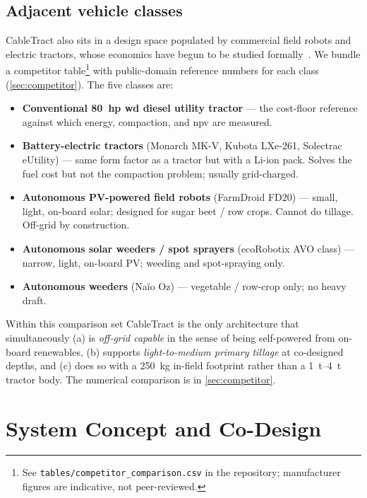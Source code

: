 \documentclass[11pt,a4paper]{article}
\begin{document}
\subsection{Adjacent vehicle classes}\label{sec:related-adjacent}

CableTract also sits in a design space populated by commercial field robots and electric tractors, whose economics have begun to be studied formally~\cite{lagnelov2021cost,lowenberg2020economics}. We bundle a competitor table\footnote{See \texttt{tables/competitor\_comparison.csv} in the repository; manufacturer figures are indicative, not peer-reviewed.} with public-domain reference numbers for each class (\cref{sec:competitor}). The five classes are:

\begin{itemize}[leftmargin=1.6em,itemsep=0.15em]
    \item \textbf{Conventional \SI{80}{hp} \gls{wd} diesel utility tractor} --- the cost-floor reference against which energy, compaction, and \gls{npv} are measured.
    \item \textbf{Battery-electric tractors} (Monarch MK-V, Kubota LXe-261, Solectrac eUtility) --- same form factor as a tractor but with a Li-ion pack. Solves the fuel cost but not the compaction problem; usually grid-charged.
    \item \textbf{Autonomous PV-powered field robots} (FarmDroid FD20) --- small, light, on-board solar; designed for sugar beet / row crops. Cannot do tillage. Off-grid by construction.
    \item \textbf{Autonomous solar weeders / spot sprayers} (ecoRobotix AVO class) --- narrow, light, on-board PV; weeding and spot-spraying only.
    \item \textbf{Autonomous weeders} (Naïo Oz) --- vegetable / row-crop only; no heavy draft.
\end{itemize}

Within this comparison set CableTract is the only architecture that simultaneously (a) is \emph{off-grid capable} in the sense of being self-powered from on-board renewables, (b) supports \emph{light-to-medium primary tillage} at co-designed depths, and (c) does so with a \SI{250}{\kilogram} in-field footprint rather than a \SIrange{1}{4}{\tonne} tractor body. The numerical comparison is in \cref{sec:competitor}.

\section{System Concept and Co-Design}\label{sec:concept}
\end{document}

